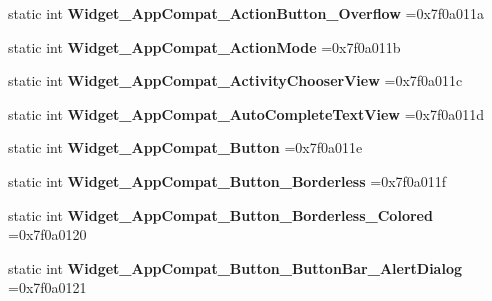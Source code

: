 \begin{DoxyCompactItemize}
\item 
\mbox{\label{classandroid_1_1support_1_1design_1_1R_1_1style_a637c2ac1e9aa30c6e2c355aba4341b8b}} 
static int {\bfseries Widget\+\_\+\+App\+Compat\+\_\+\+Action\+Button\+\_\+\+Overflow} =0x7f0a011a
\item 
\mbox{\label{classandroid_1_1support_1_1design_1_1R_1_1style_ab827d279a77b5000740ae1cd01849463}} 
static int {\bfseries Widget\+\_\+\+App\+Compat\+\_\+\+Action\+Mode} =0x7f0a011b
\item 
\mbox{\label{classandroid_1_1support_1_1design_1_1R_1_1style_acc3255a479b390ef70471357bed5fdd5}} 
static int {\bfseries Widget\+\_\+\+App\+Compat\+\_\+\+Activity\+Chooser\+View} =0x7f0a011c
\item 
\mbox{\label{classandroid_1_1support_1_1design_1_1R_1_1style_ae54bba4d35c6ff173028f2682ffe4478}} 
static int {\bfseries Widget\+\_\+\+App\+Compat\+\_\+\+Auto\+Complete\+Text\+View} =0x7f0a011d
\item 
\mbox{\label{classandroid_1_1support_1_1design_1_1R_1_1style_a80ae1480e6b19a5a1e7f91ea53ad1856}} 
static int {\bfseries Widget\+\_\+\+App\+Compat\+\_\+\+Button} =0x7f0a011e
\item 
\mbox{\label{classandroid_1_1support_1_1design_1_1R_1_1style_a894092889e1fce7f927a3ca165af9688}} 
static int {\bfseries Widget\+\_\+\+App\+Compat\+\_\+\+Button\+\_\+\+Borderless} =0x7f0a011f
\item 
\mbox{\label{classandroid_1_1support_1_1design_1_1R_1_1style_a0015570cd469e1238391257757c7f497}} 
static int {\bfseries Widget\+\_\+\+App\+Compat\+\_\+\+Button\+\_\+\+Borderless\+\_\+\+Colored} =0x7f0a0120
\item 
\mbox{\label{classandroid_1_1support_1_1design_1_1R_1_1style_ac96b10964be557f14649d81cf70fe08f}} 
static int {\bfseries Widget\+\_\+\+App\+Compat\+\_\+\+Button\+\_\+\+Button\+Bar\+\_\+\+Alert\+Dialog} =0x7f0a0121

\end{DoxyCompactItemize}
